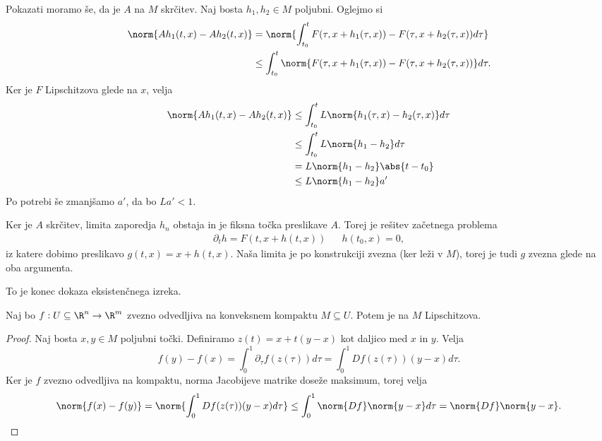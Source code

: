 Pokazati moramo še, da je $A$ na $M$ skrčitev.
Naj bosta $h_1, h_2 \in M$ poljubni.
Oglejmo si
\begin{align*}
  \norm{A h_1(t,x) - A h_2(t,x)}
  &= \norm{ \int_{t_0}^t F(\tau, x+h_1(\tau,x)) - F(\tau, x+h_2(\tau,x)) d\tau } \\
  &\le \int_{t_0}^t \norm{ F(\tau, x+h_1(\tau, x)) - F(\tau, x+h_2(\tau,x)) } d\tau.
\end{align*}
Ker je $F$ Lipschitzova glede na $x$, velja
\begin{align*}
  \norm{A h_1(t,x) - A h_2(t,x)}
  &\le \int_{t_0}^t L \norm{h_1(\tau, x) - h_2(\tau,x)} d\tau \\
  &\le \int_{t_0}^t L \norm{h_1 - h_2} d\tau \\
  &= L \norm{h_1 - h_2} \abs{t-t_0} \\
  &\le L \norm{h_1 - h_2} a'
\end{align*}
Po potrebi še zmanjšamo $a'$, da bo $La' < 1$.

Ker je $A$ skrčitev, limita zaporedja $h_n$ obstaja in je fiksna točka
preslikave $A$.
Torej je rešitev začetnega problema
\begin{align*}
  \partial_t h = F(t, x + h(t,x)) && h(t_0, x) = 0,
\end{align*}
iz katere dobimo preslikavo $g(t,x) = x + h(t,x)$.
Naša limita je po konstrukciji zvezna (ker leži v $M$), torej je tudi $g$ zvezna
glede na oba argumenta.

To je konec dokaza eksistenčnega izreka.


\begin{trditev}
  Naj bo $f: U \subseteq \R^n \to \R^m$ zvezno odvedljiva na konveksnem kompaktu
  $M \subseteq U$.
  Potem je na $M$ Lipschitzova.
\end{trditev}

\begin{proof}
  Naj bosta $x, y \in M$ poljubni točki.
  Definiramo $z(t) = x + t(y-x)$ kot daljico med $x$ in $y$.
  Velja
  \[
	f(y) - f(x) = \int_0^1 \partial_\tau f(z(\tau)) d\tau
	= \int_0^1 Df(z(\tau)) (y-x) d\tau.
  \]
  Ker je $f$ zvezno odvedljiva na kompaktu, norma Jacobijeve matrike doseže
  maksimum, torej velja
  \[
	\norm{f(x) - f(y)}
	= \norm{\int_0^1 Df(z(\tau)) (y-x) d\tau}
	\le \int_0^1 \norm{Df} \norm{y-x} d\tau
	= \norm{Df} \norm{y-x}.
  \]
\end{proof}



